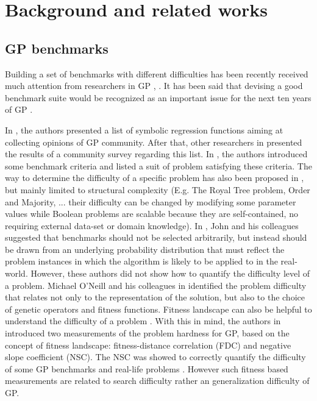 \section{Background and related works}
\label{Bac}
\subsection {GP benchmarks}
\label{GPb}

Building a set of benchmarks with different difficulties has been recently received much attention from researchers in GP \cite{2012James}, \cite{2015Mig}. It has been said that devising a good benchmark suite would be recognized as an important issue for the next ten years of GP \cite{2010O'Neill}. \par

In \cite {2012James}, the authors presented a list of symbolic regression functions aiming at collecting opinions of GP community. After that, other researchers in \cite{David2013} presented the results of a community survey regarding this list. In \cite{2012James}, the authors introduced some benchmark criteria and listed a suit of problem satisfying these criteria. The way to determine the difficulty of a specific problem has also been proposed in \cite{2012James}, but mainly limited to structural complexity (E.g. The Royal Tree problem, Order and Majority, ... their difficulty can be changed by modifying some parameter values while Boolean problems are scalable because they are self-contained, no requiring external data-set or domain knowledge). In \cite{2014John}, John  and his colleagues suggested that benchmarks should not be selected arbitrarily, but instead should be drawn from an underlying probability distribution that must reflect the problem instances in which the algorithm is likely to be applied to in the real-world. However, these authors did not show how to quantify the difficulty level of a problem. Michael O’Neill and his colleagues in \cite{2010O'Neill} identified the problem difficulty that relates not only to the representation of the solution, but also to the choice of genetic operators and fitness functions.  Fitness landscape can also be helpful to understand the difficulty of a problem \cite{2002Stadle}\cite{1932Wri}. With this in mind, the authors in \cite{2004Vanneschi}\cite{2005Vanneschi} introduced two measurements of the problem hardness for GP, based on the concept of fitness landscape: fitness-distance correlation (FDC) and negative slope coefficient (NSC). The NSC was showed to correctly quantify the difficulty of some GP benchmarks and  real-life problems \cite{2006Vanneschi}. However such fitness based measurements are related to search difficulty rather an generalization difficulty of GP. %

